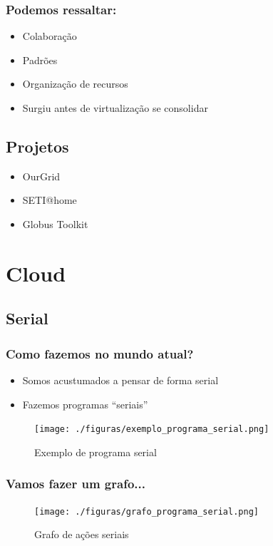 \documentclass[10pt]{beamer}
\begin{document}
	\begin{frame}%
	\frametitle{Podemos ressaltar:}
		\begin{itemize}%
			\item Colaboração
			\item Padrões
			\item Organização de recursos
			\item Surgiu antes de virtualização se consolidar
		\end{itemize}
	\end{frame}

	\subsection{Projetos}

	\begin{frame}%
		\begin{itemize}%
			\item OurGrid
			\item SETI@home
			\item Globus Toolkit
		\end{itemize}
	\end{frame}

\section{Cloud}
	\subsection{Serial}
		\begin{frame}%
		\frametitle{Como fazemos no mundo atual?}
			\begin{itemize}
				\item Somos acustumados a pensar de forma serial
				\item Fazemos programas ``seriais''
			\end{itemize}
			\begin{figure}
			\centering
				\texttt{[image: ./figuras/exemplo\_programa\_serial.png]}
				\caption{Exemplo de programa serial}
			\end{figure}
		\end{frame}

		\begin{frame}%
		\frametitle{Vamos fazer um grafo...}
			\begin{figure}
			\centering
				\texttt{[image: ./figuras/grafo\_programa\_serial.png]}
				\caption{Grafo de ações seriais}
			\end{figure}
		\end{frame}
\end{document}
